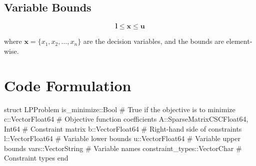 \documentclass{article}
\begin{document}
\subsection*{Variable Bounds}
\[
\mathbf{l} \leq \mathbf{x} \leq \mathbf{u}
\]

where $\mathbf{x} = \{x_1, x_2, \dots, x_n\}$ are the decision variables, and the bounds are element-wise.



\section*{Code Formulation}

\begin{jllisting}
    struct LPProblem
        is_minimize::Bool  # True if the objective is to minimize
        c::Vector{Float64}  # Objective function coefficients
        A::SparseMatrixCSC{Float64, Int64}  # Constraint matrix
        b::Vector{Float64}  # Right-hand side of constraints
        l::Vector{Float64}  # Variable lower bounds
        u::Vector{Float64}  # Variable upper bounds
        vars::Vector{String}  # Variable names
        constraint_types::Vector{Char}  # Constraint types
    end
\end{jllisting}
\end{document}

